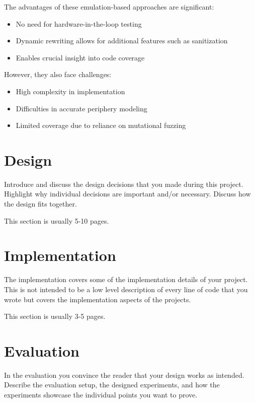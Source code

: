 \documentclass[a4paper,11pt,oneside]{report}
\begin{document}
The advantages of these emulation-based approaches are significant:
\begin{itemize}
  \item No need for hardware-in-the-loop testing
  \item Dynamic rewriting allows for additional features such as sanitization
  \item Enables crucial insight into code coverage
\end{itemize}

However, they also face challenges:
\begin{itemize}
  \item High complexity in implementation
  \item Difficulties in accurate periphery modeling
  \item Limited coverage due to reliance on mutational fuzzing
\end{itemize}

\chapter{Design}

Introduce and discuss the design decisions that you made during this project.
Highlight why individual decisions are important and/or necessary. Discuss
how the design fits together.

This section is usually 5-10 pages.


\chapter{Implementation}

The implementation covers some of the implementation details of your project.
This is not intended to be a low level description of every line of code that
you wrote but covers the implementation aspects of the projects.

This section is usually 3-5 pages.


\chapter{Evaluation}

In the evaluation you convince the reader that your design works as intended.
Describe the evaluation setup, the designed experiments, and how the
experiments showcase the individual points you want to prove.
\end{document}
